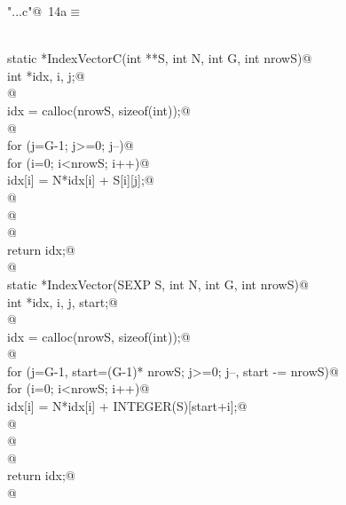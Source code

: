 \documentclass[reqno]{amsart}
\renewcommand{\NWtarget}[2]{\hypertarget{#1}{#2}}
\begin{document}
\begin{flushleft} \small\label{scrap23}\raggedright\small
\NWtarget{nuweb14a}{} \verb@"..\src\ReprodCalcs.c"@\nobreak\ {\footnotesize {14a}}$\equiv$
\vspace{-1ex}
\begin{list}{}{} \item
\mbox{}\verb@@\\
\mbox{}\verb@int static *IndexVectorC(int **S, int N, int G, int nrowS){@\\
\mbox{}\verb@ int *idx, i, j;@\\
\mbox{}\verb@ @\\
\mbox{}\verb@ idx = calloc(nrowS, sizeof(int));@\\
\mbox{}\verb@ @\\
\mbox{}\verb@ for (j=G-1; j>=0; j--){@\\
\mbox{}\verb@   for (i=0; i<nrowS; i++){@\\
\mbox{}\verb@           idx[i] = N*idx[i] + S[i][j];@\\
\mbox{}\verb@   }@\\
\mbox{}\verb@ }@\\
\mbox{}\verb@ @\\
\mbox{}\verb@ return idx;@\\
\mbox{}\verb@}@\\
\mbox{}\verb@int static *IndexVector(SEXP S, int N, int G, int nrowS){@\\
\mbox{}\verb@ int *idx, i, j,  start;@\\
\mbox{}\verb@ @\\
\mbox{}\verb@ idx = calloc(nrowS, sizeof(int));@\\
\mbox{}\verb@ @\\
\mbox{}\verb@ for (j=G-1, start=(G-1)* nrowS; j>=0; j--, start -= nrowS){@\\
\mbox{}\verb@   for (i=0; i<nrowS; i++){@\\
\mbox{}\verb@           idx[i] = N*idx[i] + INTEGER(S)[start+i];@\\
\mbox{}\verb@   }@\\
\mbox{}\verb@ }@\\
\mbox{}\verb@ @\\
\mbox{}\verb@ return idx;@\\
\mbox{}\verb@}@\\
\mbox{}\verb@@{\NWsep}
\end{list}
\vspace{-1.5ex}
\footnotesize
\begin{list}{}{\setlength{\itemsep}{-\parsep}\setlength{\itemindent}{-\leftmargin}}

\end{list}
\end{flushleft}
\end{document}
